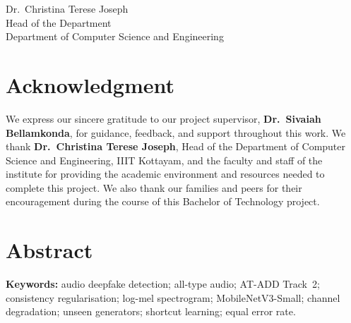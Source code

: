 \documentclass[12pt,a4paper]{report}
\newcommand{\SupervisorName}{Dr.\ Sivaiah Bellamkonda}
\newcommand{\DepartmentName}{Computer Science and Engineering}
\newcommand{\HoDName}{Dr.\ Christina Terese Joseph}
\begin{document}
\vspace{1.8cm}
\noindent\hfill
\begin{minipage}{0.7\textwidth}
\raggedleft
\HoDName\\
Head of the Department\\
Department of \DepartmentName
\end{minipage}

\clearpage
\chapter*{Acknowledgment}
\noindent
We express our sincere gratitude to our project supervisor, \textbf{\SupervisorName}, for guidance, feedback, and support throughout this work. We thank \textbf{\HoDName}, Head of the Department of \DepartmentName, IIIT Kottayam, and the faculty and staff of the institute for providing the academic environment and resources needed to complete this project. We also thank our families and peers for their encouragement during the course of this Bachelor of Technology project.

\clearpage
\chapter*{Abstract}
\begingroup
\setlength{\parskip}{0.4cm}
\noindent
\endgroup

\vspace{0.3cm}
\noindent\textbf{Keywords:} audio deepfake detection; all-type audio; AT-ADD Track~2; consistency regularisation; log-mel spectrogram; MobileNetV3-Small; channel degradation; unseen generators; shortcut learning; equal error rate.

\clearpage
\tableofcontents
\clearpage
\listoffigures
\clearpage
\listoftables
\clearpage


\clearpage
{}
\pagestyle{fancy}









\appendix


\printbibliography[title={References}, heading=bibintoc]
\end{document}
